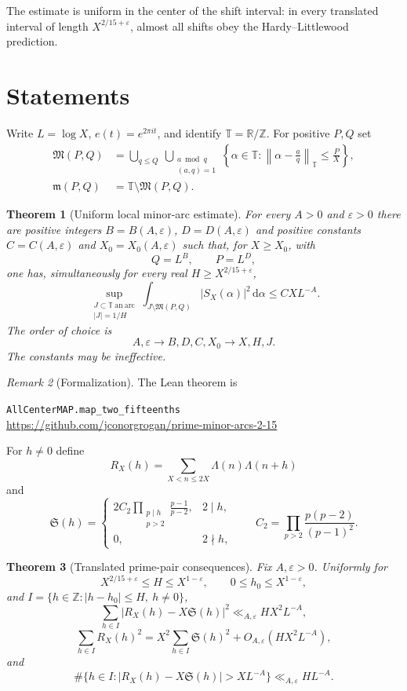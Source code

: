 \documentclass[11pt]{article}
\newtheorem{theorem}{Theorem}[section]
\theoremstyle{remark}
\newtheorem{remark}[theorem]{Remark}
\newcommand{\T}{\mathbb T}
\newcommand{\Z}{\mathbb Z}
\newcommand{\M}{\mathfrak M}
\newcommand{\m}{\mathfrak m}
\newcommand{\Sg}{\mathfrak S}
\newcommand{\eps}{\varepsilon}
\newcommand{\1}{\mathbf 1}
\newcommand{\dd}{\,\mathrm d}
\newcommand{\abs}[1]{\left|#1\right|}
\begin{document}
The estimate is uniform in the center of the shift interval: in every
translated interval of length \(X^{2/15+\eps}\), almost all shifts obey the
Hardy--Littlewood prediction.

\section{Statements}
Write $L=\log X$, $e(t)=e^{2\pi i t}$, and identify
$\T=\mathbb R/\mathbb Z$.  For positive $P,Q$ set
\begin{align*}
 \M(P,Q)
 &=\bigcup_{q\le Q}\ \bigcup_{\substack{a\bmod q\\(a,q)=1}}
 \left\{\alpha\in\T:\left\|\alpha-\frac aq\right\|_{\T}\le\frac PX\right\},\\
 \m(P,Q)
 &=\T\setminus\M(P,Q).
\end{align*}

\begin{theorem}[Uniform local minor-arc estimate]\label{thm:map}
For every $A>0$ and $\eps>0$ there are positive integers
$B=B(A,\eps)$, $D=D(A,\eps)$ and positive constants $C=C(A,\eps)$ and
$X_0=X_0(A,\eps)$ such that, for $X\ge X_0$, with
\[
 Q=L^B,\qquad P=L^D,
\]
one has, simultaneously for every real $H\ge X^{2/15+\eps}$,
\[
 \sup_{\substack{J\subset\T\ \mathrm{an\ arc}\\ |J|=1/H}}
 \int_{J\setminus\M(P,Q)}\abs{S_X(\alpha)}^2\dd\alpha
 \le CXL^{-A}.
 \tag{1.1}
\]
The order of choice is
\[
 A,\eps\longrightarrow B,D,C,X_0\longrightarrow X,H,J.
\]
The constants may be ineffective.
\end{theorem}

\begin{remark}[Formalization]
The Lean theorem is
\begin{center}
\texttt{AllCenterMAP.map\_two\_fifteenths}\\[3pt]
{\small\url{https://github.com/jconorgrogan/prime-minor-arcs-2-15}}
\end{center}
\end{remark}

For $h\ne0$ define
\[
 R_X(h)=\sum_{X<n\le2X}\Lambda(n)\Lambda(n+h)
\]
and
\[
 \Sg(h)=
 \begin{cases}
 2C_2\displaystyle\prod_{\substack{p\mid h\\p>2}}\frac{p-1}{p-2},&2\mid h,\\[5pt]
 0,&2\nmid h,
 \end{cases}
 \qquad C_2=\prod_{p>2}\frac{p(p-2)}{(p-1)^2}.
\]

\begin{theorem}[Translated prime-pair consequences]\label{thm:pairs}
Fix $A,\eps>0$.  Uniformly for
\[
 X^{2/15+\eps}\le H\le X^{1-\eps},\qquad
 0\le h_0\le X^{1-\eps},
\]
and $I=\{h\in\Z:|h-h_0|\le H,\ h\ne0\}$,
\[
 \sum_{h\in I}\abs{R_X(h)-X\Sg(h)}^2
 \ll_{A,\eps}HX^2L^{-A},                                      \tag{1.2}
\]
\[
 \sum_{h\in I}R_X(h)^2
 =X^2\sum_{h\in I}\Sg(h)^2+O_{A,\eps}(HX^2L^{-A}),           \tag{1.3}
\]
and
\[
 \#\{h\in I:\abs{R_X(h)-X\Sg(h)}>XL^{-A}\}
 \ll_{A,\eps}HL^{-A}.                                        \tag{1.4}
\]
\end{theorem}
\end{document}
